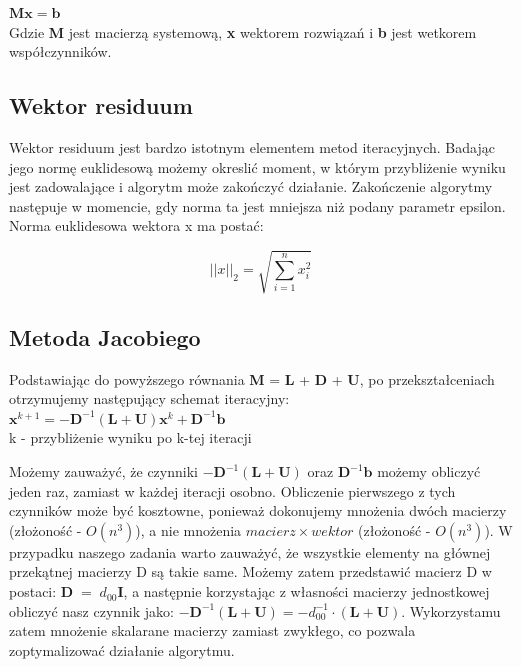 \documentclass[fleqn]{article}
\begin{document}
    $\bm{M}\bm{x} = \bm{b}$ \\

    \noindent Gdzie \textbf{M} jest macierzą systemową, \textbf{x} wektorem rozwiązań i \textbf{b} jest wetkorem współczynników.

    \subsection{Wektor residuum}
    Wektor residuum jest bardzo istotnym elementem metod iteracyjnych.
    Badając jego normę euklidesową możemy okreslić moment, w którym przybliżenie wyniku jest
    zadowalające i algorytm może zakończyć działanie. Zakończenie algorytmy następuje w momencie,
    gdy norma ta jest mniejsza niż podany parametr epsilon.\\

    \noindent Norma euklidesowa wektora x ma postać:

        \[ 
            || x ||_2 = \sqrt{ \sum_{i = 1}^{n} x_i^2} 
       \]


    \subsection{Metoda Jacobiego}

    Podstawiając do powyższego równania \textbf{M} = \textbf{L} + \textbf{D} + \textbf{U}, 
    po przekształceniach otrzymujemy następujący schemat iteracyjny: \\
    
    $\bm{x}^{k+1} = -\bm{D}^{-1}(\bm{L} + \bm{U})\bm{x}^k + \bm{D}^{-1}\bm{b}$ \\

    \noindent k - przybliżenie wyniku po k-tej iteracji

    \newpage

    \noindent Możemy zauważyć, że czynniki $-\bm{D}^{-1}(\bm{L} + \bm{U})$ oraz $\bm{D}^{-1}\bm{b}$
    możemy obliczyć jeden raz, zamiast w każdej iteracji osobno. Obliczenie pierwszego z tych czynników może być
    kosztowne, ponieważ dokonujemy mnożenia dwóch macierzy (złożoność - $O(n^3)$), 
    a nie mnożenia $macierz \times wektor$ (złożoność - $O(n^3)$). W przypadku naszego zadania warto zauważyć,
    że wszystkie elementy na głównej przekątnej macierzy D są takie same.
    Możemy zatem przedstawić macierz D w postaci: $\bm{D} \; = \; d_{00}\bm{I}$, a następnie korzystając z własności 
    macierzy jednostkowej obliczyć nasz czynnik jako: $-\bm{D}^{-1}(\bm{L} + \bm{U}) = -d^{-1}_{00} \cdot (\bm{L} + \bm{U})$.
    Wykorzystamu zatem mnożenie skalarane macierzy zamiast zwykłego, co pozwala
    zoptymalizować działanie algorytmu. \\ 
    
\end{document}
